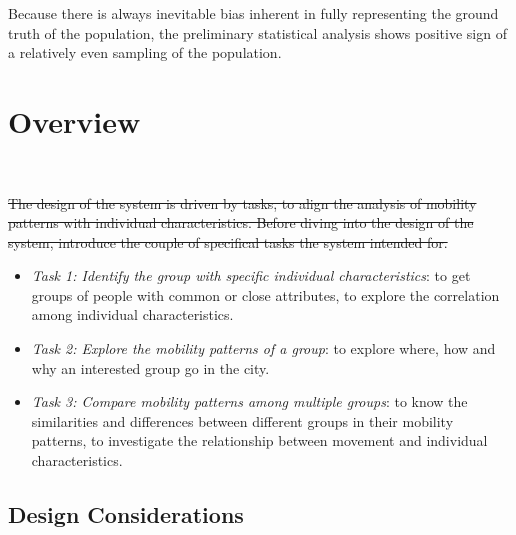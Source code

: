 Because there is always inevitable bias inherent in fully representing the ground truth of the population, the preliminary statistical analysis shows positive sign of a relatively even sampling of the population.


\section{Overview}


\\

\sout{The design of the system is driven by tasks, to align the analysis of mobility patterns with individual characteristics. Before diving into the design of the system, introduce the couple of specifical tasks the system intended for.}

\begin{itemize}
\item \textit{Task 1: Identify the group with specific individual characteristics}: to get groups of people with common or close attributes, to explore the correlation among individual characteristics.
\item \textit{Task 2: Explore the mobility patterns of a group}: to explore where, how and why an interested group go in the city.
\item \textit{Task 3: Compare mobility patterns among multiple groups}: to know the similarities and differences between different groups in their mobility patterns, to investigate the relationship between movement and individual characteristics.
\end{itemize}

\subsection{Design Considerations}

